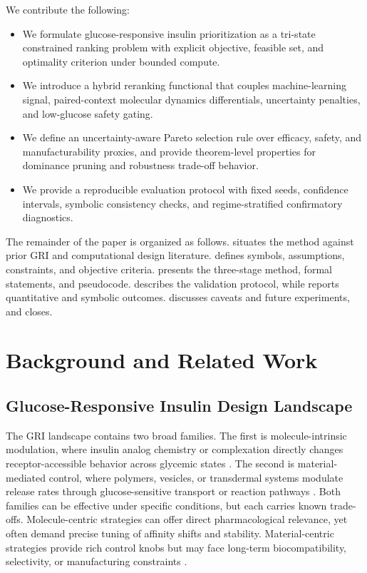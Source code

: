 \documentclass{article} %
\begin{document}
We contribute the following:
\begin{itemize}
\item We formulate glucose-responsive insulin prioritization as a tri-state constrained ranking problem with explicit objective, feasible set, and optimality criterion under bounded compute.
\item We introduce a hybrid reranking functional that couples machine-learning signal, paired-context molecular dynamics differentials, uncertainty penalties, and low-glucose safety gating.
\item We define an uncertainty-aware Pareto selection rule over efficacy, safety, and manufacturability proxies, and provide theorem-level properties for dominance pruning and robustness trade-off behavior.
\item We provide a reproducible evaluation protocol with fixed seeds, confidence intervals, symbolic consistency checks, and regime-stratified confirmatory diagnostics.
\end{itemize}

The remainder of the paper is organized as follows.  situates the method against prior GRI and computational design literature.  defines symbols, assumptions, constraints, and objective criteria.  presents the three-stage method, formal statements, and pseudocode.  describes the validation protocol, while  reports quantitative and symbolic outcomes.  discusses caveats and future experiments, and  closes.

\section{Background and Related Work}
\label{sec:related}
\subsection{Glucose-Responsive Insulin Design Landscape}
The GRI landscape contains two broad families. The first is molecule-intrinsic modulation, where insulin analog chemistry or complexation directly changes receptor-accessible behavior across glycemic states \citep{src01,src12,src13,src41}. The second is material-mediated control, where polymers, vesicles, or transdermal systems modulate release rates through glucose-sensitive transport or reaction pathways \citep{src03,src04,src06,src42,src44}. Both families can be effective under specific conditions, but each carries known trade-offs. Molecule-centric strategies can offer direct pharmacological relevance, yet often demand precise tuning of affinity shifts and stability. Material-centric strategies provide rich control knobs but may face long-term biocompatibility, selectivity, or manufacturing constraints \citep{src09,src10,src11,src44}.
\end{document}
